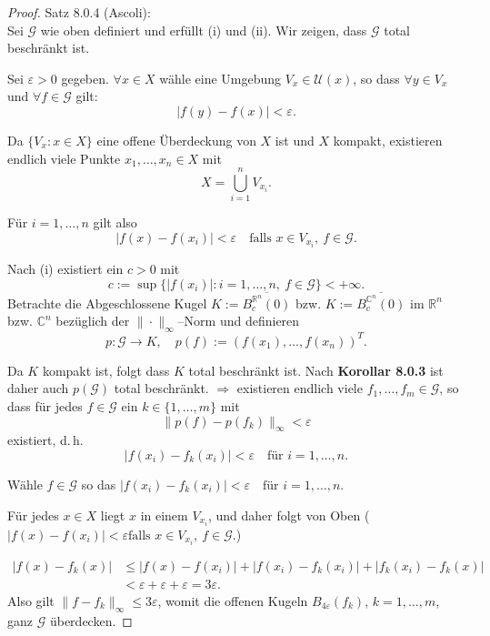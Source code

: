 \begin{proof}{Satz 8.0.4 (Ascoli):}\\
    Sei $\mathcal{G}$ wie oben definiert und erfüllt (i) und (ii). 
    Wir zeigen, dass $\mathcal{G}$ total beschränkt ist. 

    Sei $\varepsilon > 0$ gegeben. 
    $ \forall x \in X$ wähle eine Umgebung $V_x \in \mathcal{U}(x)$, 
    so dass $\forall y \in V_x$ und $\forall f \in \mathcal{G}$ gilt:
    $$
    |f(y) - f(x)| < \varepsilon.
    $$

    Da $\{V_x : x \in X\}$ eine offene Überdeckung von $X$ ist 
    und $X$ kompakt, existieren endlich viele Punkte 
    $x_1, \dots, x_n \in X$ mit
    $$
    X = \bigcup_{i=1}^{n} V_{x_i}.
    $$

    Für $i = 1, \dots, n$ gilt also
    $$
    |f(x) - f(x_i)| < \varepsilon 
    \quad \text{falls } x \in V_{x_i},\ f \in \mathcal{G}. 
    $$

    Nach (i) existiert ein $c > 0$ mit 
    $$
    c := \sup\{ |f(x_i)| : i = 1, \dots, n,\ f \in \mathcal{G} \} < +\infty.
    $$
    Betrachte die Abgeschlossene  Kugel $K := \overline{B_c^{\mathbb{R}^n}(0)}$ 
    bzw. $K := \overline{B_c^{\mathbb{C}^n}(0)}$ im $\mathbb{R}^n$ bzw. $\mathbb{C}^n$ 
    bezüglich der $\|\cdot\|_\infty$–Norm und definieren
    $$
    p : \mathcal{G} \to K, \quad p(f) := (f(x_1), \dots, f(x_n))^T.
    $$

    Da $K$ kompakt ist, folgt dass $K$
    total beschränkt ist. 
    Nach \textbf{Korollar 8.0.3} ist daher auch $p(\mathcal{G})$ 
    total beschränkt. 
    $\Rightarrow$ existieren endlich viele $f_1, \dots, f_m \in \mathcal{G}$, so dass 
    für jedes $f \in \mathcal{G}$ ein $k \in \{1, \dots, m\}$ mit
    $$
    \|p(f) - p(f_k)\|_\infty < \varepsilon
    $$
    existiert, d.\,h.
    $$
    |f(x_i) - f_k(x_i)| < \varepsilon \quad \text{für } i = 1, \dots, n.
    $$

    Wähle $f \in \mathcal{G}$ so das $|f(x_i) - f_k(x_i)| < \varepsilon \quad \text{für } i = 1, \dots, n.$
    
    Für jedes $x \in X$ liegt $x$ in einem $V_{x_i}$, und daher folgt von 
    Oben ($|f(x) - f(x_i)| < \varepsilon 
    \text{falls } x \in V_{x_i},\ f \in \mathcal{G}.$)
    

    \begin{equation*}
    \begin{split}
        |f(x) - f_k(x)| 
        &\le |f(x) - f(x_i)| + |f(x_i) - f_k(x_i)| + |f_k(x_i) - f_k(x)| \\
        &< \varepsilon + \varepsilon + \varepsilon = 3\varepsilon.
    \end{split}
    \end{equation*}
    Also gilt $\|f - f_k\|_\infty \le 3\varepsilon$, womit die offenen Kugeln 
    $B_{4\varepsilon}(f_k)$, $k = 1, \dots, m$, ganz $\mathcal{G}$ überdecken.


\end{proof}

